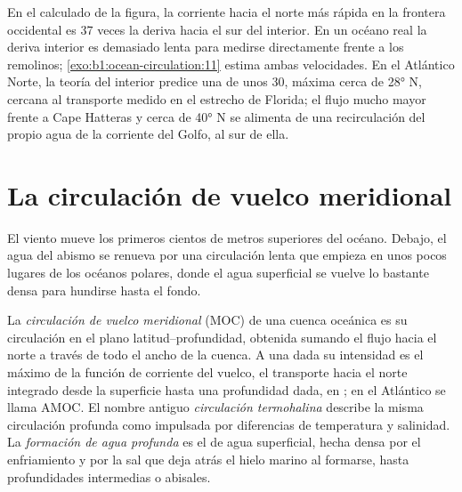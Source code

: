 En el  calculado de la figura, la corriente hacia el norte más rápida en la frontera occidental es 37 veces la deriva hacia el sur del interior. En un océano real la deriva interior es demasiado lenta para medirse directamente frente a los remolinos; \cref{exo:b1:ocean-circulation:11} estima ambas velocidades.
En el Atlántico Norte, la teoría del interior predice una  de unos \qty{30}{\sverdrup}, máxima cerca de \ang{28} N, cercana al transporte medido en el estrecho de Florida; el flujo mucho mayor frente a Cape Hatteras y cerca de \ang{40} N se alimenta de una recirculación del propio agua de la corriente del Golfo, al sur de ella.

\section{La circulación de vuelco meridional}\label{sec:b1:ocean-circulation:moc}

El viento mueve los primeros cientos de metros superiores del océano. Debajo, el agua del abismo se renueva por una circulación lenta que empieza en unos pocos lugares de los océanos polares, donde el agua superficial se vuelve lo bastante densa para hundirse hasta el fondo.

\begin{definition}\label{def:b1:ocean-circulation:moc}
La \emph{circulación de vuelco meridional} (MOC) de una cuenca oceánica es su circulación en el plano latitud--profundidad, obtenida sumando el flujo hacia el norte a través de todo el ancho de la cuenca. A una  dada su intensidad es el máximo de la función de corriente del vuelco, el transporte hacia el norte integrado desde la superficie hasta una profundidad dada, en ; en el Atlántico se llama AMOC. El nombre antiguo \emph{circulación termohalina} describe la misma circulación profunda como impulsada por diferencias de temperatura y salinidad. La \emph{formación de agua profunda} es el  de agua superficial, hecha densa por el enfriamiento y por la sal que deja atrás el hielo marino al formarse, hasta profundidades intermedias o abisales.
\end{definition}

